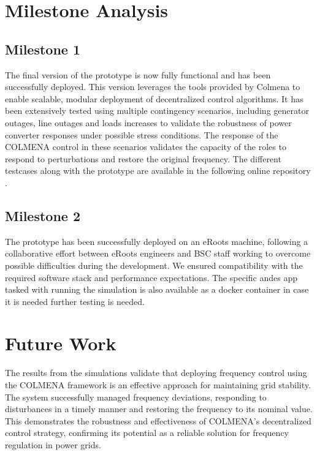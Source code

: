 \documentclass{article}
\begin{document}
\newpage
\section{Milestone Analysis}

\subsection*{Milestone 1}

The final version of the prototype is now fully functional and has been successfully deployed. This version leverages the tools provided by Colmena to enable scalable, modular deployment of decentralized control algorithms. It has been extensively tested using multiple contingency scenarios, including generator outages, line outages and loads increases to validate the robustness of power converter responses under possible stress conditions. The response of the COLMENA control in these scenarios validates the capacity of the roles to respond to perturbations and restore the original frequency. The different testcases along with the prototype are available in the following online repository \cite{repo:colmenaeroots}.

\subsection*{Milestone 2}

The prototype has been successfully deployed on an eRoots machine, following a collaborative effort between eRoots engineers and BSC staff working to overcome possible difficulties during the development. We ensured compatibility with the required software stack and performance expectations. The specific andes app tasked with running the simulation is also available as a docker container in case it is needed further testing is needed. 

\newpage
\section{Future Work}

The results from the simulations validate that deploying frequency control using the COLMENA framework is an effective approach for maintaining grid stability. The system successfully managed frequency deviations, responding to disturbances in a timely manner and restoring the frequency to its nominal value. This demonstrates the robustness and effectiveness of COLMENA's decentralized control strategy, confirming its potential as a reliable solution for frequency regulation in power grids.
\end{document}
